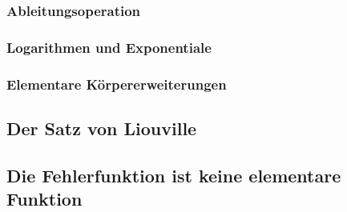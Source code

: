 \subsubsection{Ableitungsoperation}

\subsubsection{Logarithmen und Exponentiale}

\subsubsection{Elementare Körpererweiterungen}

\subsection{Der Satz von Liouville
\label{buch:integrale:section:liouville}}

\subsection{Die Fehlerfunktion ist keine elementare Funktion
\label{buch:integrale:section:fehlernichtelementar}}

